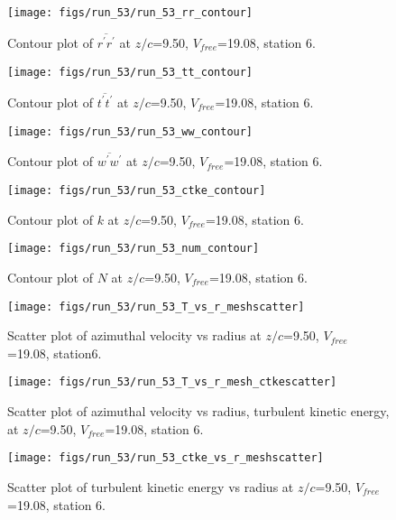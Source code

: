 \begin{figure}[H]
\centering
\texttt{[image: figs/run\_53/run\_53\_rr\_contour]}
\caption{Contour plot of $\overline{r^\prime r^\prime}$ at $z/c$=9.50, $V_{free}$=19.08, station 6.}
\label{fig:run_53_rr_contour}
\end{figure}


\begin{figure}[H]
\centering
\texttt{[image: figs/run\_53/run\_53\_tt\_contour]}
\caption{Contour plot of $\overline{t^\prime t^\prime}$ at $z/c$=9.50, $V_{free}$=19.08, station 6.}
\label{fig:run_53_tt_contour}
\end{figure}


\begin{figure}[H]
\centering
\texttt{[image: figs/run\_53/run\_53\_ww\_contour]}
\caption{Contour plot of $\overline{w^\prime w^\prime}$ at $z/c$=9.50, $V_{free}$=19.08, station 6.}
\label{fig:run_53_ww_contour}
\end{figure}


\begin{figure}[H]
\centering
\texttt{[image: figs/run\_53/run\_53\_ctke\_contour]}
\caption{Contour plot of $k$ at $z/c$=9.50, $V_{free}$=19.08, station 6.}
\label{fig:run_53_ctke_contour}
\end{figure}


\begin{figure}[H]
\centering
\texttt{[image: figs/run\_53/run\_53\_num\_contour]}
\caption{Contour plot of $N$ at $z/c$=9.50, $V_{free}$=19.08, station 6.}
\label{fig:run_53_num_contour}
\end{figure}


\begin{figure}[H]
\centering
\texttt{[image: figs/run\_53/run\_53\_T\_vs\_r\_meshscatter]}
\caption{Scatter plot of azimuthal velocity vs radius at $z/c$=9.50, $V_{free}$=19.08, station6.}
\label{fig:run_53_T_vs_r_meshscatter}
\end{figure}


\begin{figure}[H]
\centering
\texttt{[image: figs/run\_53/run\_53\_T\_vs\_r\_mesh\_ctkescatter]}
\caption{Scatter plot of azimuthal velocity vs radius, turbulent kinetic energy, at $z/c$=9.50, $V_{free}$=19.08, station 6.}
\label{fig:run_53_T_vs_r_mesh_ctkescatter}
\end{figure}


\begin{figure}[H]
\centering
\texttt{[image: figs/run\_53/run\_53\_ctke\_vs\_r\_meshscatter]}
\caption{Scatter plot of turbulent kinetic energy vs radius at $z/c$=9.50, $V_{free}$=19.08, station 6.}
\label{fig:run_53_ctke_vs_r_meshscatter}
\end{figure}


